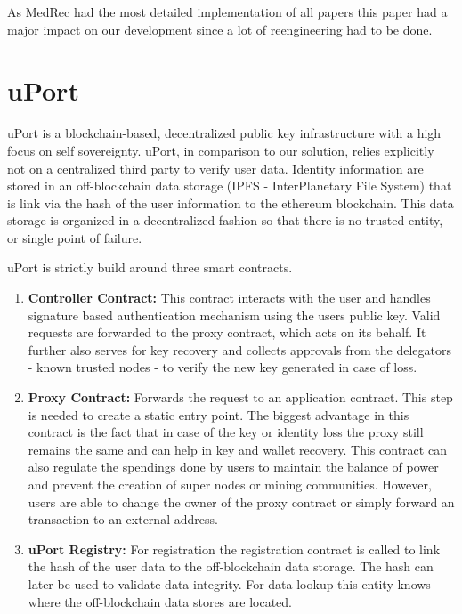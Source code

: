 As MedRec had the most detailed implementation of all papers this paper had a major impact on our development since
a lot of reengineering had to be done.

\section{uPort}
uPort is a blockchain-based, decentralized public key infrastructure with a high focus on self sovereignty. uPort, in comparison to our solution, relies explicitly not on a centralized third party to verify user data.\cite[p. 2]{uPortWhitePaper}
Identity information are stored in an off-blockchain data storage (IPFS - InterPlanetary File System) that is link via the hash of the user information to the ethereum blockchain. This data storage is organized in a decentralized fashion so that there is no trusted entity, or single point of failure. 

\noindent uPort is strictly build around three smart contracts.
\begin{enumerate}
\item \textbf{Controller Contract:} This contract interacts with the user and handles signature based authentication mechanism using the users public key. Valid requests are forwarded to the proxy contract, which acts on its behalf. 
It further also serves for key recovery and collects approvals from the delegators - known trusted nodes - to verify the new key generated in case of loss.

\item \textbf{Proxy Contract:}
Forwards the request to an application contract. This step is needed to create a static entry point.
The biggest advantage in this contract is the fact that in case of the key or identity loss the proxy still remains the same and can help in key and wallet recovery.
This contract can also regulate the spendings done by users to maintain the balance of power and prevent the creation of super nodes or mining communities.
However, users are able to change the owner of the proxy contract or simply forward an transaction to an external address\cite[p. 6]{uPortWhitePaper}.

\item \textbf{uPort Registry:}
For registration the registration contract is called to link the hash of the user data to the off-blockchain data storage. The hash can later be used to validate data integrity. 
For data lookup this entity knows where the off-blockchain data stores are located.

\end{enumerate}


